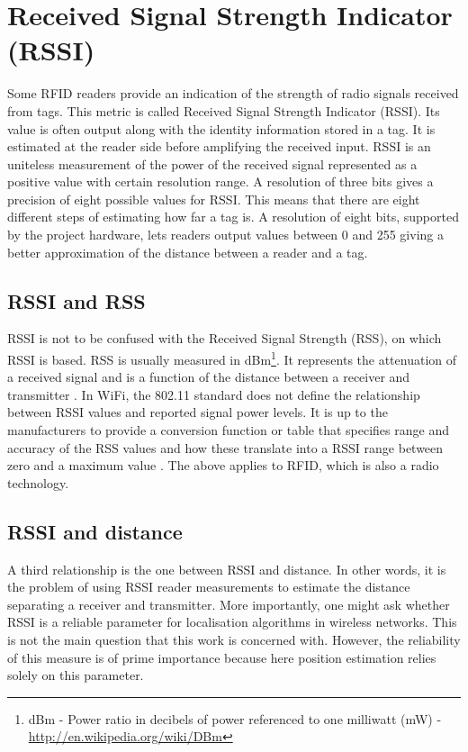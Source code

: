 \section{Received Signal Strength Indicator (RSSI)}
\label{sec:rssi}

Some RFID readers provide an indication of the strength of radio signals received from tags. This metric is called Received Signal Strength Indicator (RSSI). Its value is often output along with the identity information stored in a tag. It is estimated at the reader side before amplifying the received input. RSSI is an uniteless measurement of the power of the received signal represented as a positive value with certain resolution range. A resolution of three bits gives a precision of eight possible values for RSSI. This means that there are eight different steps of estimating how far a tag is. A resolution of eight bits, supported by the project hardware, lets readers output values between 0 and 255 giving a better approximation of the distance between a reader and a tag. 

\subsection{RSSI and RSS}

RSSI is not to be confused with the Received Signal Strength (RSS), on which RSSI is based. RSS is usually measured in dBm\footnote{dBm - Power ratio in decibels of power referenced to one milliwatt (mW) - \url{http://en.wikipedia.org/wiki/DBm}}. It represents the attenuation of a received signal and is a function of the distance between a receiver and transmitter \cite{Bouet2008}. In WiFi, the 802.11 standard does not define the relationship between RSSI values and reported signal power levels. It is up to the manufacturers to provide a conversion function or table that specifies range and accuracy of the RSS values and how these translate into a RSSI range between zero and a maximum value \cite{Lui2011}. The above applies to RFID, which is also a radio technology. 

\subsection{RSSI and distance}

A third relationship is the one between RSSI and distance. In other words, it is the problem of using RSSI reader measurements to estimate the distance separating a receiver and transmitter. More importantly, one might ask whether RSSI is a reliable parameter for localisation algorithms in wireless networks. This is not the main question that this work is concerned with. However, the reliability of this measure is of prime importance because here position estimation relies solely on this parameter. 


